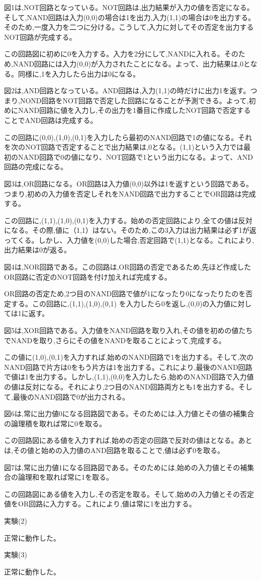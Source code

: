 \documentclass[a4paper,11pt,titlepage]{jarticle}
\begin{document}
図1は,NOT回路となっている。NOT回路は,出力結果が入力の値を否定になる。そして,NAND回路は入力(0,0)の場合は1を出力,入力(1,1)の場合は0を出力する。そのため,一度入力を二つに分ける。こうして,入力に対してその否定を出力するNOT回路が完成する。\par
この回路図に初めに0を入力する。入力を2分にして,NANDに入れる。そのため,NAND回路には入力(0,0)が入力されたことになる。よって、出力結果は,0となる。同様に,1を入力したら出力は0になる。\par
図2は,AND回路となっている。AND回路は,入力(1,1)の時だけに出力1を返す。つまり,NOND回路をNOT回路で否定した回路になることが予測できる。よって,初めにNAND回路に値を入力し,その出力を1番目に作成したNOT回路で否定することでAND回路は完成する。\par
この回路に(0,0),(1,0),(0,1)を入力したら最初のNAND回路で1の値になる。それを次のNOT回路で否定することで出力結果は,0となる。(1,1)という入力では最初のNAND回路で0の値になり、NOT回路で1という出力になる。よって、AND回路の完成になる。\par
図3は,OR回路になる。OR回路は入力値(0,0)以外は1を返すという回路である。つまり,初めの入力値を否定しそれをNAND回路で出力することでOR回路は完成する。\par
この回路に,(1,1),(1,0),(0,1)を入力する。始めの否定回路により,全ての値は反対になる。その際,値に（1,1）はない。そのため,この3入力は出力結果は必ず1が返ってくる。しかし、入力値を(0,0)した場合,否定回路で(1,1)となる。これにより,出力結果は0が返る。\par
図4は,NOR回路である。この回路は,OR回路の否定であるため,先ほど作成したOR回路に否定のNOT回路を付け加えれば完成する。\par
OR回路の否定ため,2つ目のNAND回路で値が1になったり0になったりたのを否定する。この回路に,(1,1),(1,0),(0,1)
を入力したら0を返し,(0,0)の入力値に対しては1に返す。\par
図5は,XOR回路である。入力値をNAND回路を取り入れ,その値を初めの値たちでNANDを取り,さらにその値をNANDを取ることによって,完成する。\par
この値に(1,0),(0,1)を入力すれば,始めのNAND回路で1を出力する。そして,次のNAND回路で片方は0をもう片方は1を出力する。これにより,最後のNAND回路で値は1を出力する。しかし,(1,1),(0,0)を入力したら,始めのNAND回路で入力値の値は反対になる。それにより,2つ目のNAND回路両方とも1を出力する。そして,最後のNAND回路で0が出力される。\par
図6は,常に出力値0になる回路図である。そのためには,入力値とその値の補集合の論理積を取れば常に0を取る。\par
この回路図にある値を入力すれば,始めの否定の回路で反対の値はとなる。あとは,その値と始めの入力値のAND回路を取ることで,値は必ず0を取る。\par
図7は,常に出力値1になる回路図である。そのためには,始めの入力値とその補集合の論理和を取れば常に1を取る。\par
この回路図にある値を入力し,その否定を取る。そして,始めの入力値とその否定値をOR回路に入力する。これにより,値は常に1を出力する。\par
実験(2)\par
正常に動作した。\par
実験(3)\par
正常に動作した。\par
\end{document}
